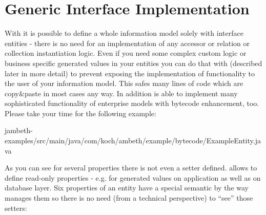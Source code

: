 \section{Generic Interface Implementation}
\label{feature:InterfaceImpl}
\ClearAPI
With \AMBETH{} it is possible to define a whole information model solely with interface entities - there is no need for an implementation of any accessor or relation or collection instantiation logic. Even if you need some complex custom logic or business specific generated values in your entities you can do that with  (described later in more detail) to prevent exposing the implementation of functionality to the user of your information model. This safes many lines of code which are copy\&paste in most cases any way. In addition \AMBETH{} is able to implement many sophisticated functionality of enterprise models with bytecode enhancement, too. Please take your time for the following example:

	{jambeth-examples/src/main/java/com/koch/ambeth/example/bytecode/ExampleEntity.java}

As you can see for several properties there is not even a setter defined. \AMBETH{} allows to define read-only properties - e.g. for generated values on application as well as on database layer. Six properties of an entity have a special semantic by the way \AMBETH{} manages them so there is no need (from a technical perspective) to ``see'' those setters:

